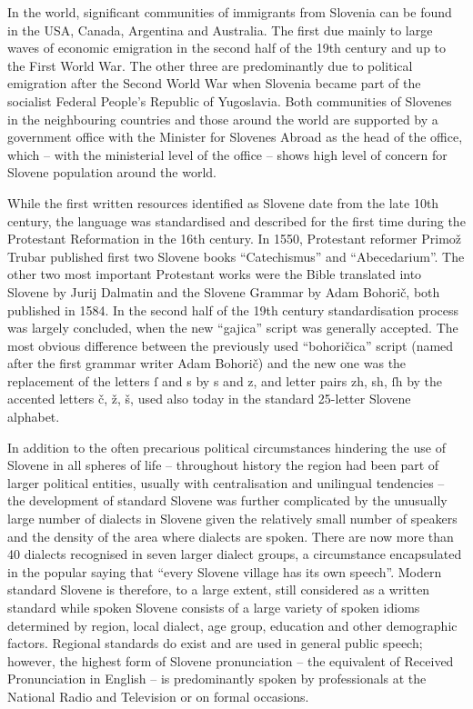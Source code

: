 \begin{multicols}{2}
In the world, significant communities of immigrants from Slovenia can be found in the USA, Canada, Argentina and Australia. The first due mainly to large waves of economic emigration in the second half of the 19th century and up to the First World War. The other three are predominantly due to political emigration after the Second World War when Slovenia became part of the socialist Federal People's Republic of Yugoslavia. Both communities of Slovenes in the neighbouring countries and those around the world are supported by a government office with the Minister for Slovenes Abroad as the head of the office, which – with the ministerial level of the office – shows high level of concern for Slovene population around the world.

While the first written resources identified as Slovene date from the late 10th century, the language was standardised and described for the first time during the Protestant Reformation in the 16th century. In 1550, Protestant reformer Primož Trubar published first two Slovene books ``Catechismus'' and ``Abecedarium''. The other two most important Protestant works were the Bible translated into Slovene by Jurij Dalmatin and the Slovene Grammar by Adam Bohorič, both published in 1584. In the second half of the 19th century standardisation process was largely concluded, when the new ``gajica'' script was generally accepted. The most obvious difference between the previously used ``bohoričica'' script (named after the first grammar writer Adam Bohorič) and the new one was the replacement of the letters ſ and s by s and z, and letter pairs zh, sh, ſh by  the accented letters č, ž, š, used also today in the standard 25-letter Slovene alphabet.


In addition to the often precarious political circumstances hindering the use of Slovene in all spheres of life – throughout history the region had been part of larger political entities, usually with centralisation and unilingual tendencies – the development of standard Slovene was further complicated by the unusually large number of dialects in Slovene given the relatively small number of speakers and the density of the area where dialects are spoken. There are now more than 40 dialects recognised in seven larger dialect groups, a circumstance encapsulated in the popular saying that ``every Slovene village has its own speech''. Modern standard Slovene is therefore, to a large extent, still considered as a written standard while spoken Slovene consists of a large variety of spoken idioms determined by region, local dialect, age group, education and other demographic factors. Regional standards do exist and are used in general public speech; however, the highest form of Slovene pronunciation – the equivalent of Received Pronunciation in English – is predominantly spoken by professionals at the National Radio and Television or on formal occasions.


\end{multicols}
